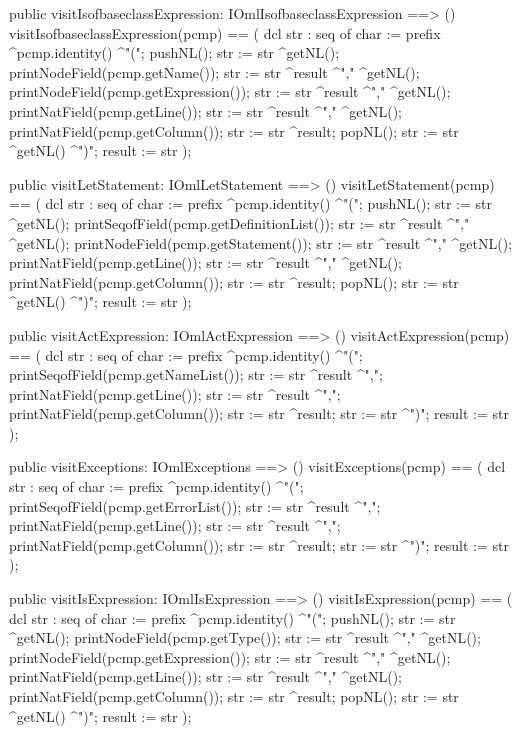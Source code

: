 \begin{vdm_al}
  public visitIsofbaseclassExpression: IOmlIsofbaseclassExpression ==> ()
  visitIsofbaseclassExpression(pcmp) ==
    ( dcl str : seq of char := prefix ^pcmp.identity() ^"(";
      pushNL();
      str := str ^getNL();
      printNodeField(pcmp.getName());
      str := str ^result ^"," ^getNL();
      printNodeField(pcmp.getExpression());
      str := str ^result ^"," ^getNL();
      printNatField(pcmp.getLine());
      str := str ^result ^"," ^getNL();
      printNatField(pcmp.getColumn());
      str := str ^result;
      popNL();
      str := str ^getNL() ^")";
      result := str );

  public visitLetStatement: IOmlLetStatement ==> ()
  visitLetStatement(pcmp) ==
    ( dcl str : seq of char := prefix ^pcmp.identity() ^"(";
      pushNL();
      str := str ^getNL();
      printSeqofField(pcmp.getDefinitionList());
      str := str ^result ^"," ^getNL();
      printNodeField(pcmp.getStatement());
      str := str ^result ^"," ^getNL();
      printNatField(pcmp.getLine());
      str := str ^result ^"," ^getNL();
      printNatField(pcmp.getColumn());
      str := str ^result;
      popNL();
      str := str ^getNL() ^")";
      result := str );

  public visitActExpression: IOmlActExpression ==> ()
  visitActExpression(pcmp) ==
    ( dcl str : seq of char := prefix ^pcmp.identity() ^"(";
      printSeqofField(pcmp.getNameList());
      str := str ^result ^",";
      printNatField(pcmp.getLine());
      str := str ^result ^",";
      printNatField(pcmp.getColumn());
      str := str ^result;
      str := str ^")";
      result := str );

  public visitExceptions: IOmlExceptions ==> ()
  visitExceptions(pcmp) ==
    ( dcl str : seq of char := prefix ^pcmp.identity() ^"(";
      printSeqofField(pcmp.getErrorList());
      str := str ^result ^",";
      printNatField(pcmp.getLine());
      str := str ^result ^",";
      printNatField(pcmp.getColumn());
      str := str ^result;
      str := str ^")";
      result := str );

  public visitIsExpression: IOmlIsExpression ==> ()
  visitIsExpression(pcmp) ==
    ( dcl str : seq of char := prefix ^pcmp.identity() ^"(";
      pushNL();
      str := str ^getNL();
      printNodeField(pcmp.getType());
      str := str ^result ^"," ^getNL();
      printNodeField(pcmp.getExpression());
      str := str ^result ^"," ^getNL();
      printNatField(pcmp.getLine());
      str := str ^result ^"," ^getNL();
      printNatField(pcmp.getColumn());
      str := str ^result;
      popNL();
      str := str ^getNL() ^")";
      result := str );


\end{vdm_al}
